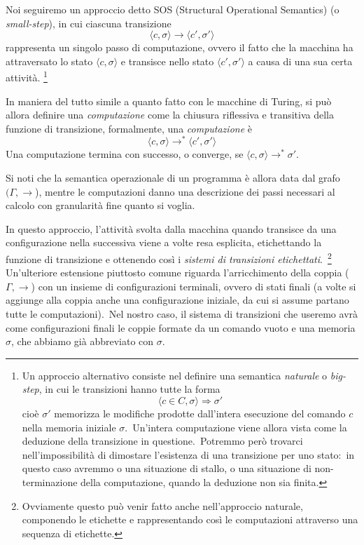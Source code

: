 \noindent Noi seguiremo un approccio detto SOS (Structural Operational Semantics) (o \textit{small-step}), in cui ciascuna transizione \[\langle c, \sigma\rangle \rightarrow \langle c', \sigma' \rangle\]
rappresenta un singolo passo di computazione, ovvero il fatto che la macchina ha attraversato lo stato $\langle c, \sigma\rangle$ e transisce nello stato $\langle c', \sigma'\rangle$ a causa di una sua certa attività.
\footnote{Un approccio alternativo consiste nel definire una semantica \textit{naturale} o \textit{big-step}, in cui le transizioni hanno tutte la forma \[\langle c \in C, \sigma\rangle \Rightarrow \sigma'\] cioè $\sigma'$ memorizza le modifiche prodotte dall'intera esecuzione del comando $c$ nella memoria iniziale $\sigma$.\ Un'intera computazione viene allora vista come la deduzione della transizione in questione.\ Potremmo però trovarci nell'impossibilità di dimostare l'esistenza di una transizione per uno stato:\ in questo caso avremmo o una situazione di stallo, o una situazione di non-terminazione della computazione, quando la deduzione non sia finita.}

In maniera del tutto simile a quanto fatto con le macchine di Turing, si
può allora definire una \textit{computazione} come la chiusura riflessiva e transitiva della funzione di transizione, formalmente, una \textit{computazione} è \[\langle c, \sigma\rangle \rightarrow^* \langle c', \sigma' \rangle\]
Una computazione termina con successo, o converge, se $\langle c, \sigma\rangle \rightarrow^* \sigma'$.

Si noti che la semantica operazionale di un programma è allora data dal grafo $(\Gamma, \rightarrow$), mentre le computazioni danno una descrizione dei passi necessari al calcolo con granularità fine quanto si voglia.\

In questo approccio, l'attività svolta dalla macchina quando transisce da una configurazione nella successiva viene a volte resa esplicita, etichettando la funzione di transizione e ottenendo così i \textit{sistemi di transizioni etichettati}.\
\footnote{Ovviamente questo può venir fatto anche nell'approccio naturale, componendo le etichette e rappresentando così le computazioni attraverso una sequenza di etichette.}
Un'ulteriore estensione piuttosto comune riguarda l'arricchimento della coppia ($\Gamma, \rightarrow$) con un insieme di configurazioni terminali, ovvero di stati finali (a volte si aggiunge alla coppia anche una configurazione iniziale, da cui si assume partano tutte le computazioni).\
Nel nostro caso, il sistema di transizioni che useremo avrà come configurazioni finali le coppie formate da un comando vuoto e una memoria $\sigma$, che abbiamo già abbreviato con $\sigma$.

